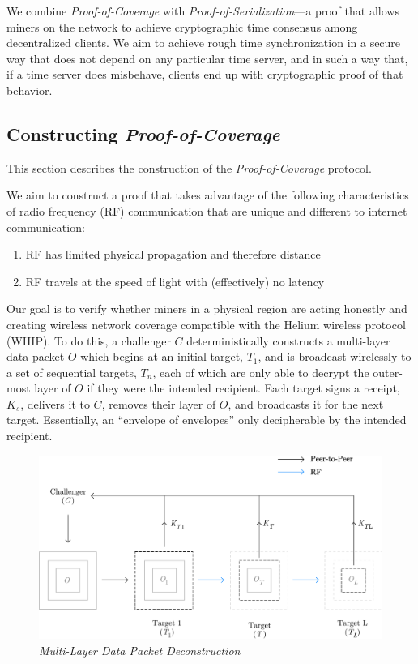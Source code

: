 \documentclass[UTF8, 10pt, nonatbib, nocopyrightspace, reprint]{sigplanconf}
\begin{document}
We combine \emph{Proof-of-Coverage} with \emph{Proof-of-Serialization}---a proof that allows miners on the network to achieve cryptographic time consensus among decentralized clients. We aim to achieve rough time synchronization in a secure way that does not depend on any particular time server, and in such a way that, if a time server does misbehave, clients end up with cryptographic proof of that behavior.

\subsection{Constructing \emph{Proof-of-Coverage}}

This section describes the construction of the \emph{Proof-of-Coverage} protocol.

We aim to construct a proof that takes advantage of the following characteristics of radio frequency (RF) communication that are unique and different to internet communication:

\begin{enumerate}
    \item RF has limited physical propagation and therefore distance
    \item RF travels at the speed of light with (effectively) no latency
\end{enumerate}

Our goal is to verify whether miners in a physical region are acting honestly and creating wireless network coverage compatible with the Helium wireless protocol (WHIP). To do this, a challenger $C$ deterministically constructs a multi-layer data packet $O$ which begins at an initial target, $T_1$, and is broadcast wirelessly to a set of sequential targets, $T_n$, each of which are only able to decrypt the outer-most layer of $O$ if they were the intended recipient. Each target signs a receipt, $K_s$, delivers it to $C$, removes their layer of $O$, and broadcasts it for the next target. Essentially, an ``envelope of envelopes'' only decipherable by the intended recipient.

\begin{figure}[ht]
    \begin{center}
          \includegraphics[width=\columnwidth]{deconstruction.eps}
          \caption{\emph{Multi-Layer Data Packet Deconstruction}}
          \label{fig:poc-deconstruction}
     \end{center}
\end{figure}
\end{document}
